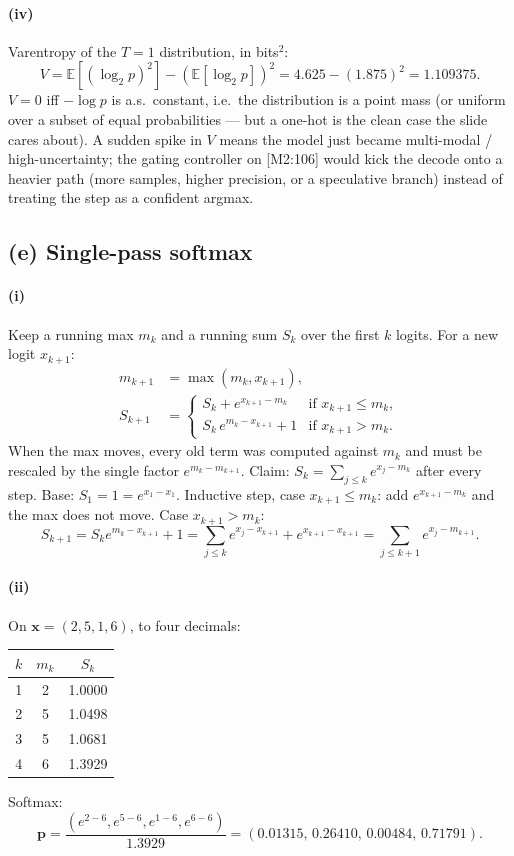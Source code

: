 \documentclass[11pt]{article}
\newcommand{\vct}[1]{\mathbf{#1}}
\begin{document}
\paragraph{(iv)}
Varentropy of the \(T=1\) distribution, in bits\(^2\):
\[
V=\mathbb{E}[(\log_2 p)^2]-(\mathbb{E}[\log_2 p])^2
=4.625-(1.875)^2=1.109375.
\]
\(V=0\) iff \(-\log p\) is a.s.\ constant, i.e.\ the distribution is
a point mass (or uniform over a subset of equal probabilities --- but
a one-hot is the clean case the slide cares about). A sudden spike in
\(V\) means the model just became multi-modal / high-uncertainty; the
gating controller on [M2:106] would kick the decode onto a heavier
path (more samples, higher precision, or a speculative branch) instead
of treating the step as a confident argmax.

\subsection*{(e) Single-pass softmax}

\paragraph{(i)}
Keep a running max \(m_k\) and a running sum \(S_k\) over the first
\(k\) logits. For a new logit \(x_{k+1}\):
\[
\begin{aligned}
m_{k+1}&=\max(m_k,x_{k+1}),\\
S_{k+1}
&=
\begin{cases}
S_k+e^{x_{k+1}-m_k}
  & \text{if }x_{k+1}\le m_k,\\[2pt]
S_k\,e^{m_k-x_{k+1}}+1
  & \text{if }x_{k+1}>m_k.
\end{cases}
\end{aligned}
\]
When the max moves, every old term was computed against \(m_k\) and
must be rescaled by the single factor \(e^{m_k-m_{k+1}}\).
Claim: \(S_k=\sum_{j\le k}e^{x_j-m_k}\) after every step.
Base: \(S_1=1=e^{x_1-x_1}\).
Inductive step, case \(x_{k+1}\le m_k\): add \(e^{x_{k+1}-m_k}\) and
the max does not move.
Case \(x_{k+1}>m_k\):
\[
S_{k+1}
=S_k e^{m_k-x_{k+1}}+1
=\sum_{j\le k}e^{x_j-x_{k+1}}+e^{x_{k+1}-x_{k+1}}
=\sum_{j\le k+1}e^{x_j-m_{k+1}}.
\]

\paragraph{(ii)}
On \(\vct{x}=(2,5,1,6)\), to four decimals:
\begin{center}
\begin{tabular}{c cc}
\toprule
\(k\) & \(m_k\) & \(S_k\) \\
\midrule
1 & 2 & 1.0000 \\
2 & 5 & 1.0498 \\
3 & 5 & 1.0681 \\
4 & 6 & 1.3929 \\
\bottomrule
\end{tabular}
\end{center}
Softmax:
\[
\vct{p}
=\frac{(e^{2-6},e^{5-6},e^{1-6},e^{6-6})}{1.3929}
=(0.01315,\,0.26410,\,0.00484,\,0.71791).
\]
\end{document}
